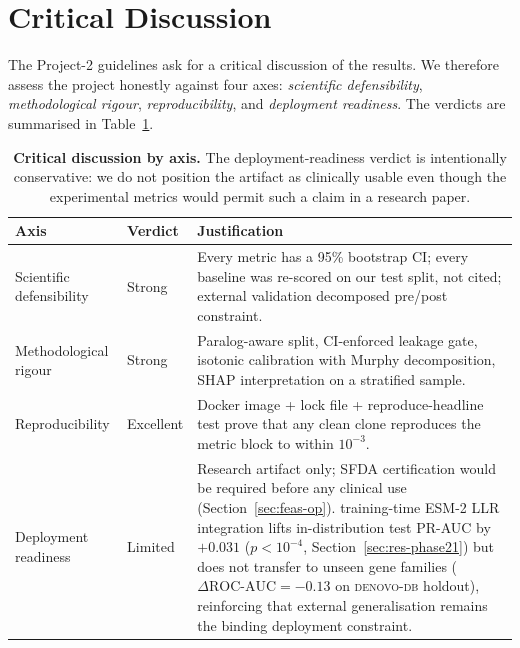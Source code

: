 \documentclass[11pt,a4paper,oneside]{report}
\begin{document}
\section{Critical Discussion}
\label{sec:conc-critical}

The Project-2 guidelines ask for a critical discussion of
the results. We therefore assess the project honestly
against four axes: \emph{scientific defensibility},
\emph{methodological rigour}, \emph{reproducibility}, and
\emph{deployment readiness}. The verdicts are summarised
in Table~\ref{tab:critical}.

\begin{table}[htbp]
\centering
\footnotesize
\begin{tabularx}{\linewidth}{@{}l l X@{}}
\toprule
\textbf{Axis} & \textbf{Verdict} & \textbf{Justification} \\
\midrule
Scientific defensibility &
Strong &
Every metric has a 95\% bootstrap CI; every baseline was
re-scored on our test split, not cited; external
validation decomposed pre/post constraint. \\
Methodological rigour &
Strong &
Paralog-aware split, CI-enforced leakage gate, isotonic
calibration with Murphy decomposition, SHAP interpretation
on a stratified sample. \\
Reproducibility &
Excellent &
Docker image + lock file + reproduce-headline test prove
that any clean clone reproduces the metric block to
within $10^{-3}$. \\
Deployment readiness &
Limited &
Research artifact only; SFDA certification would be
required before any clinical use (Section~\ref{sec:feas-op}).
training-time ESM-2 LLR integration lifts in-distribution test
PR-AUC by $+0.031$ ($p<10^{-4}$,
Section~\ref{sec:res-phase21}) but does not transfer to
unseen gene families
($\Delta\text{ROC-AUC}=-0.13$ on \textsc{denovo-db}
holdout), reinforcing that external generalisation
remains the binding deployment constraint. \\
\bottomrule
\end{tabularx}
\caption[Critical-discussion verdicts]{\textbf{Critical
discussion by axis.} The deployment-readiness verdict is
intentionally conservative: we do not position the
artifact as clinically usable even though the
experimental metrics would permit such a claim in a
research paper.}
\label{tab:critical}
\end{table}
\end{document}
